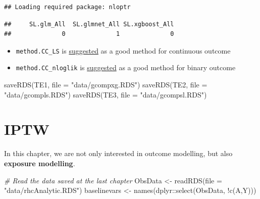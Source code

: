 \documentclass[
]{book}
\newenvironment{Shaded}{\begin{snugshade}}{\end{snugshade}}
\newcommand{\AttributeTok}[1]{\textcolor[rgb]{0.77,0.63,0.00}{#1}}
\newcommand{\CommentTok}[1]{\textcolor[rgb]{0.56,0.35,0.01}{\textit{#1}}}
\newcommand{\FunctionTok}[1]{\textcolor[rgb]{0.00,0.00,0.00}{#1}}
\newcommand{\NormalTok}[1]{#1}
\newcommand{\OtherTok}[1]{\textcolor[rgb]{0.56,0.35,0.01}{#1}}
\newcommand{\SpecialCharTok}[1]{\textcolor[rgb]{0.00,0.00,0.00}{#1}}
\newcommand{\StringTok}[1]{\textcolor[rgb]{0.31,0.60,0.02}{#1}}
\providecommand{\tightlist}{%
  \setlength{\itemsep}{0pt}\setlength{\parskip}{0pt}}
\begin{document}
\begin{verbatim}
## Loading required package: nloptr
\end{verbatim}

\begin{Shaded}
\end{Shaded}

\begin{verbatim}
##     SL.glm_All  SL.glmnet_All SL.xgboost_All 
##              0              1              0
\end{verbatim}

\begin{itemize}
\tightlist
\item
  \texttt{method.CC\_LS} is \href{https://si.biostat.washington.edu/sites/default/files/modules/lab1_0.pdf}{suggested} as a good method for continuous outcome
\item
  \texttt{method.CC\_nloglik} is \href{https://si.biostat.washington.edu/sites/default/files/modules/lab1_0.pdf}{suggested} as a good method for binary outcome
\end{itemize}

\begin{Shaded}
\begin{Highlighting}[]
\FunctionTok{saveRDS}\NormalTok{(TE1, }\AttributeTok{file =} \StringTok{"data/gcompxg.RDS"}\NormalTok{)}
\FunctionTok{saveRDS}\NormalTok{(TE2, }\AttributeTok{file =} \StringTok{"data/gcompls.RDS"}\NormalTok{)}
\FunctionTok{saveRDS}\NormalTok{(TE3, }\AttributeTok{file =} \StringTok{"data/gcompsl.RDS"}\NormalTok{)}
\end{Highlighting}
\end{Shaded}

\hypertarget{iptw}{%
\chapter{IPTW}\label{iptw}}

In this chapter, we are not only interested in outcome modelling, but also \textbf{exposure modelling}.

\begin{Shaded}
\begin{Highlighting}[]
\CommentTok{\# Read the data saved at the last chapter}
\NormalTok{ObsData }\OtherTok{\textless{}{-}} \FunctionTok{readRDS}\NormalTok{(}\AttributeTok{file =} \StringTok{"data/rhcAnalytic.RDS"}\NormalTok{)}
\NormalTok{baselinevars }\OtherTok{\textless{}{-}} \FunctionTok{names}\NormalTok{(dplyr}\SpecialCharTok{::}\FunctionTok{select}\NormalTok{(ObsData, }\SpecialCharTok{!}\FunctionTok{c}\NormalTok{(A,Y)))}
\end{Highlighting}
\end{Shaded}
\end{document}
